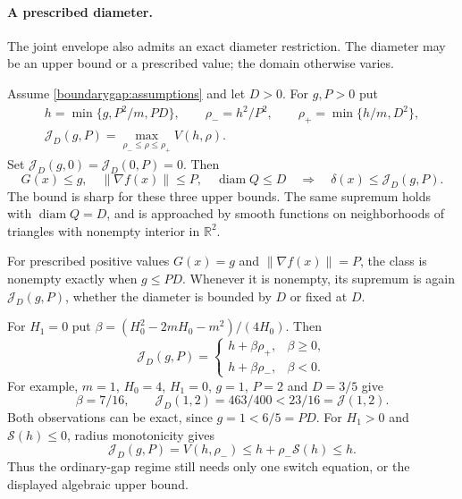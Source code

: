 \paragraph{A prescribed diameter.}
The joint envelope also admits an exact diameter restriction. The
diameter may be an upper bound or a prescribed value; the domain
otherwise varies.

\begin{theorem}
\label{jointdiam:main}
Assume \eqref{boundarygap:assumptions} and let $D>0$. For $g,P>0$ put
\begin{equation}\label{jointdiam:definition}
 \begin{gathered}
 h=\min\{g,P^2/m,PD\},\qquad
 \rho_-=h^2/P^2,\qquad \rho_+=\min\{h/m,D^2\},\\
 \mathcal J_D(g,P)=\max_{\rho_-\le\rho\le\rho_+}V(h,\rho).
 \end{gathered}
\end{equation}
Set $\mathcal J_D(g,0)=\mathcal J_D(0,P)=0$. Then
\[
 G(x)\le g,\quad \|\nabla f(x)\|\le P,\quad
 \operatorname{diam}Q\le D
 \quad\Longrightarrow\quad
 \delta(x)\le\mathcal J_D(g,P).
\]
The bound is sharp for these three upper bounds. The same supremum
holds with $\operatorname{diam}Q=D$, and is approached by smooth
functions on neighborhoods of triangles with nonempty interior in
$\mathbb R^2$.

For prescribed positive values $G(x)=g$ and $\|\nabla f(x)\|=P$,
the class is nonempty exactly when $g\le PD$. Whenever it is
nonempty, its supremum is again $\mathcal J_D(g,P)$, whether the
diameter is bounded by $D$ or fixed at $D$.
\end{theorem}

For $H_1=0$ put
$\beta=(H_0^2-2mH_0-m^2)/(4H_0)$. Then
\begin{equation}\label{jointdiam:constant}
 \mathcal J_D(g,P)=
 \begin{cases}
 h+\beta\rho_+,&\beta\ge0,\\
 h+\beta\rho_-,&\beta<0.
 \end{cases}
\end{equation}
For example, $m=1$, $H_0=4$, $H_1=0$, $g=1$, $P=2$ and
$D=3/5$ give
\[
 \beta=7/16,\qquad
 \mathcal J_D(1,2)=463/400<23/16=\mathcal J(1,2).
\]
Both observations can be exact, since $g=1<6/5=PD$.
For $H_1>0$ and $\mathcal S(h)\le0$, radius monotonicity gives
\begin{equation}\label{jointdiam:ordinary}
 \mathcal J_D(g,P)=V(h,\rho_-)
       \le h+\rho_-\mathcal S(h)\le h.
\end{equation}
Thus the ordinary-gap regime still needs only one switch equation,
or the displayed algebraic upper bound.

